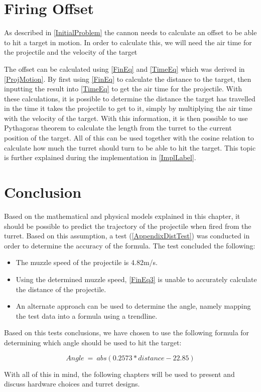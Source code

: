 \section{Firing Offset}
As described in \autoref{InitialProblem} the cannon needs to calculate an
offset to be able to hit a target in motion. In order to calculate this, we will
need the air time for the projectile and the velocity of the target\nl

The offset can be calculated using \autoref{FinEq} and \autoref{TimeEq} which
was derived in \autoref{ProjMotion}. By first using \autoref{FinEq} to
calculate the distance to the target, then inputting the result into
\autoref{TimeEq} to get the air time for the projectile. With these
calculations, it is possible to determine the distance the target has travelled in the time it
takes the projectile to get to it, simply by multiplying the air time with the
velocity of the target. With this information, it is then possible to use
Pythagoras theorem to calculate the length from the turret to the current
position of the target. All of this can be used together with the
cosine relation to calculate how much the turret should turn to be able to hit
the target. This topic is further explained during the implementation in
\autoref{ImplLabel}.

\section{Conclusion}
Based on the mathematical and physical models explained in this chapter, it
should be possible to predict the trajectory of the projectile when fired from
the turret. Based on this assumption, a test (\autoref{AppendixDistTest}) was
conducted in order to determine the accuracy of the formula. The test concluded
the following:
\begin{itemize}
  \item The muzzle speed of the projectile is 4.82m/s.
  \item Using the determined muzzle speed, \autoref{FinEq3} is unable to
  accurately calculate the distance of the projectile.
  \item An alternate approach can be used to determine the angle, namely mapping
  the test data into a formula using a trendline.  
\end{itemize}

Based on this tests conclusions, we have chosen to use the following formula for
determining which angle should be used to hit the target:

\begin{equation}\label{angleCalc}
Angle\ =\ abs(0.2573 * distance - 22.85)
\end{equation}


With all of this in mind, the following chapters will be used to present
and discuss hardware choices and turret designs.
